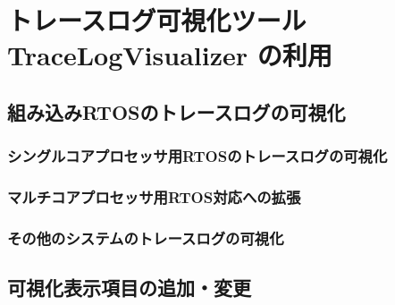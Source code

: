 \chapter{トレースログ可視化ツール TraceLogVisualizer の利用}

\section{組み込みRTOSのトレースログの可視化}

\subsection{シングルコアプロセッサ用RTOSのトレースログの可視化}

\subsection{マルチコアプロセッサ用RTOS対応への拡張}

\subsection{その他のシステムのトレースログの可視化}

\section{可視化表示項目の追加・変更}
